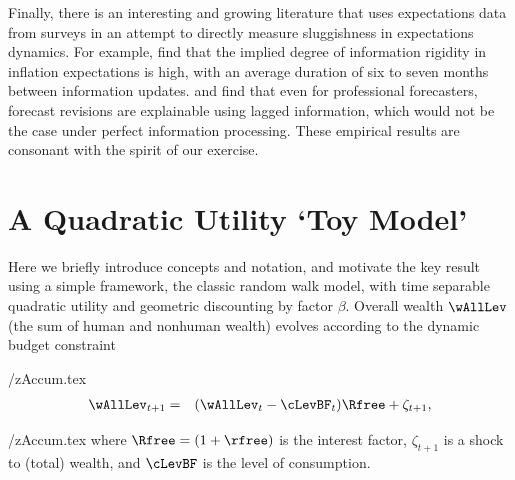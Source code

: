 \documentclass[titlepage]{\econtex}
\begin{document}
Finally, there is an interesting and growing literature that uses expectations data from surveys in an attempt to directly measure sluggishness in expectations dynamics.
For example, \cite{coibGor:AER15} find that the implied degree of information rigidity in inflation expectations is high, with an average duration of six to seven months between information updates. \cite{fuhrer:JME17} and \cite{fuhrerIntrinsicPersistence} find that even for professional forecasters, forecast revisions are explainable using lagged information, which would not be the case under perfect information processing.  These empirical results are consonant with the spirit of our exercise.

\hypertarget{Quadratic}{}
\section{A Quadratic Utility `Toy Model'}\label{sec:Quadratic}

Here we briefly introduce concepts and notation, and motivate the key result using a simple framework, the classic \cite{hallRandomWalk} random walk model, with time separable quadratic utility and geometric discounting by factor $\beta$.  Overall wealth $\wAllLev$ (the sum of human and nonhuman wealth) evolves according to the dynamic budget constraint
\begin{verbatimwrite}{\eq/zAccum.tex}
\begin{eqnarray}
  \wAllLev_{t+1} & = & (\wAllLev_{t}-\cLevBF_{t})\Rfree+\zeta_{t+1}, \label{eq:zAccum}
\end{eqnarray}
\end{verbatimwrite}
 \eq/zAccum.tex
where $\Rfree=(1+\rfree)$ is the interest factor, $\zeta_{t+1}$ is a shock to (total) wealth, and $\cLevBF$ is the level of consumption.
\end{document}
